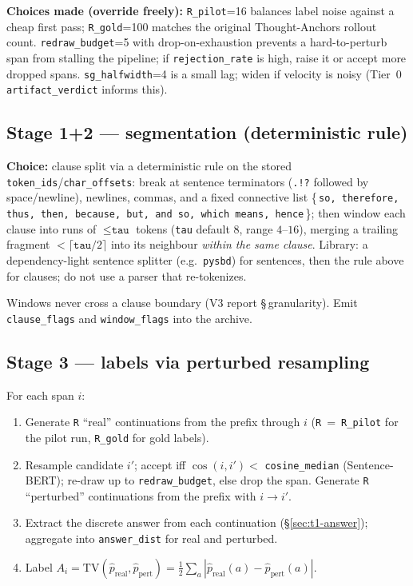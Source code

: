 \documentclass[11pt]{article}
\newcommand{\out}[1]{\texttt{#1}}      %
\newcommand{\param}[1]{\texttt{#1}}    %
\begin{document}
\begin{choice}
\textbf{Choices made (override freely):} \param{R\_pilot}=16 balances label noise
against a cheap first pass; \param{R\_gold}=100 matches the original Thought-Anchors
rollout count. \param{redraw\_budget}=5 with drop-on-exhaustion prevents a
hard-to-perturb span from stalling the pipeline; if \out{rejection\_rate} is high,
raise it or accept more dropped spans. \param{sg\_halfwidth}=4 is a small lag; widen
if velocity is noisy (Tier~0 \out{artifact\_verdict} informs this).
\end{choice}

\subsection{Stage 1+2 --- segmentation (deterministic rule)}
\label{sec:t1-seg}
\begin{choice}
\textbf{Choice:} clause split via a deterministic rule on the stored
\out{token\_ids}/\out{char\_offsets}: break at sentence terminators
(\texttt{.!?} followed by space/newline), newlines, commas, and a fixed connective
list \{\,\texttt{so, therefore, thus, then, because, but, and so, which means,
hence}\,\}; then window each clause into runs of $\le\param{tau}$ tokens
(\param{tau} default $8$, range $4$--$16$), merging a trailing fragment
$<\!\lceil\param{tau}/2\rceil$ into its neighbour \emph{within the same clause}.
Library: a dependency-light sentence splitter (e.g.\ \texttt{pysbd}) for sentences,
then the rule above for clauses; do not use a parser that re-tokenizes.
\end{choice}
Windows never cross a clause boundary (V3 report \S\,granularity). Emit
\out{clause\_flags} and \out{window\_flags} into the archive.

\subsection{Stage 3 --- labels via perturbed resampling}
\label{sec:t1-label}
For each span $i$:
\begin{enumerate}[leftmargin=1.4em,itemsep=1pt]
\item Generate \param{R} ``real'' continuations from the prefix through $i$
(\param{R}~=~\param{R\_pilot} for the pilot run, \param{R\_gold} for gold labels).
\item Resample candidate $i'$; accept iff $\cos(i,i') < $ \out{cosine\_median}
(Sentence-BERT); re-draw up to \param{redraw\_budget}, else drop the span.
Generate \param{R} ``perturbed'' continuations from the prefix with $i\!\to\!i'$.
\item Extract the discrete answer from each continuation (\S\ref{sec:t1-answer});
aggregate into \out{answer\_dist} for real and perturbed.
\item Label $A_i = \mathrm{TV}(\hat p_{\text{real}}, \hat p_{\text{pert}})
= \tfrac12\sum_a |\hat p_{\text{real}}(a) - \hat p_{\text{pert}}(a)|$.
\end{enumerate}
\end{document}
